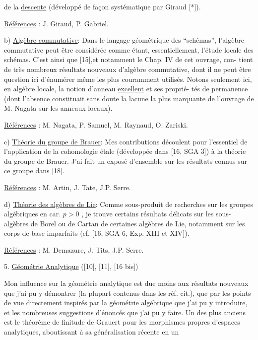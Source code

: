 
de la \uline{descente} (développé de façon systématique par Giraud [*]).

\uline{Références} : J. Giraud, P. Gabriel.

b) \uline{Algèbre commutative}: Dans le langage géométrique des ``schémas'', l'algèbre
commutative peut être considérée comme étant, essentiellement, l'étude locale
des schémas. C'est ainsi que [15],et notamment le Chap. IV de cet ouvrage, con-%
tient de très nombreux résultats nouveaux d'algèbre commutative, dont il ne
peut être question ici d'énumérer même les plus couramment utilisés. Notons
seulement ici, en algèbre locale, la notion d'anneau \uline{excellent} et ses proprié-%
tés de permanence (dont l'absence constituait sans doute la lacune la plus
marquante de l'ouvrage de M. Nagata sur les anneaux locaux).

\uline{Références} : M. Nagata, P. Samuel, M. Raynaud, O. Zariski.

c) \uline{Théorie du groupe de Brauer}: Mes contributions découlent pour l'essentiel
de l'application de la cohomologie étale (développée dans [16, SGA 3]) à la
théorie du groupe de Brauer. J'ai fait un exposé d'ensemble sur les résultats
connus sur ce groupe dans [18].

\uline{Références} : M. Artin, J. Tate, J.P. Serre.

d) \uline{Théorie des algèbres de Lie}: Comme sous-produit de recherches sur les
groupes algébriques en car. $p > 0$ , je trouve certains résultats délicats sur
les sous-algèbres de Borel ou de Cartan de certaines algèbres de Lie, notamment
sur les corps de base imparfaits (cf. [16, SGA 6, Exp. XIII et XIV]).

\uline{Références} : M. Demazure, J. Tits, J.P. Serre.

5. \uline{Géométrie Analytique} ([10], [11], [16 bis])

Mon influence sur la géométrie analytique est due moins aux résultats
nouveaux que j'ai pu y démontrer (la plupart contenus dans les réf. cit.), que
par les points de vue directement inspirés par la géométrie algébrique que j'ai
pu y introduire, et les nombreuses suggestions d'énoncés que j'ai pu y faire.
Un des plus anciens est le théorème de finitude de Grauert pour les morphismes
propres d'espaces analytiques, aboutissant à sa généralisation récente en un

